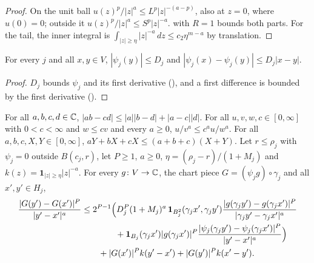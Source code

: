 \begin{proof}
\leanok
On the unit ball $u(z)^p / |z|^a \leq L^p |z|^{-(a - p)}$, also at $z = 0$, where $u(0) = 0$;
outside it $u(z)^p / |z|^a \leq S^p |z|^{-a}$.  with $R = 1$
bounds both parts. For the tail, the inner integral is
$\int_{|z| \geq \eta} |z|^{-a} \, dz \leq c_2 \eta^{m - a}$ by translation.
\end{proof}

\begin{lemma}
\label{lem:boundary-partition-lipschitz}
\leanok
{}
For every $j$ and all $x, y \in V$, $|\psi_j(y)| \leq D_j$ and
$|\psi_j(x) - \psi_j(y)| \leq D_j |x - y|$.
\end{lemma}

\begin{proof}
\leanok
$D_j$ bounds $\psi_j$ and its first derivative (), and a first
difference is bounded by the first derivative ().
\end{proof}

\begin{lemma}
\label{lem:chart-piece-integrand}
\leanok
{}
For all $a, b, c, d \in \mathbb{C}$, $|ab - cd| \leq |a| |b - d| + |a - c| |d|$. For all
$u, v, w, c \in [0, \infty]$ with $0 < c < \infty$ and $w \leq c v$ and every $a \geq 0$,
$u / v^a \leq c^a u / w^a$. For all $a, b, c, X, Y \in [0, \infty]$,
$aY + bX + cX \leq (a + b + c)(X + Y)$. Let $r \leq \rho_j$ with $\psi_j = 0$ outside
$B(c_j, r)$, let $P \geq 1$, $a \geq 0$, $\eta = (\rho_j - r) / (1 + M_j)$ and
$k(z) = \mathbf 1_{|z| \geq \eta} |z|^{-a}$. For every $g \colon V \to \mathbb{C}$, the chart piece
$G = (\psi_j g) \circ \gamma_j$ and all $x', y' \in H_j$,
\begin{align*}
  \frac{|G(y') - G(x')|^P}{|y' - x'|^a}
  &\leq 2^{P-1} \Bigl( D_j^P (1 + M_j)^a \, \mathbf 1_{B_j^2}(\gamma_j x', \gamma_j y')
      \frac{|g(\gamma_j y') - g(\gamma_j x')|^P}{|\gamma_j y' - \gamma_j x'|^a} \\
  &\qquad\qquad + \mathbf 1_{B_j}(\gamma_j x') |g(\gamma_j x')|^P
      \frac{|\psi_j(\gamma_j y') - \psi_j(\gamma_j x')|^P}{|y' - x'|^a} \Bigr) \\
  &\qquad + |G(x')|^P k(y' - x') + |G(y')|^P k(x' - y') .
\end{align*}
\end{lemma}

